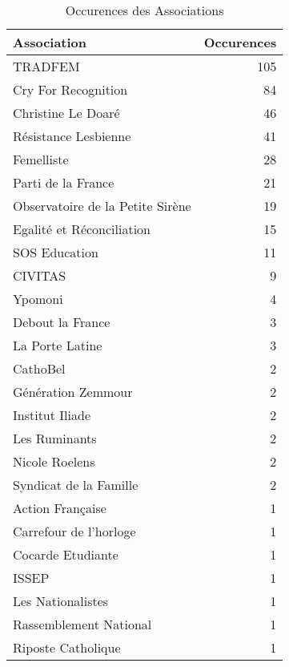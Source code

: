 \begin{table}

\caption{Occurences des Associations}
\centering
\begin{tabular}[t]{l|r}
\hline
Association & Occurences\\
\hline
TRADFEM & 105\\
\hline
Cry For Recognition & 84\\
\hline
Christine Le Doaré & 46\\
\hline
Résistance Lesbienne & 41\\
\hline
Femelliste & 28\\
\hline
Parti de la France & 21\\
\hline
Observatoire de la Petite Sirène & 19\\
\hline
Egalité et Réconciliation & 15\\
\hline
SOS Education & 11\\
\hline
CIVITAS & 9\\
\hline
Ypomoni & 4\\
\hline
Debout la France & 3\\
\hline
La Porte Latine & 3\\
\hline
CathoBel & 2\\
\hline
Génération Zemmour & 2\\
\hline
Institut Iliade & 2\\
\hline
Les Ruminants & 2\\
\hline
Nicole Roelens & 2\\
\hline
Syndicat de la Famille & 2\\
\hline
Action Française & 1\\
\hline
Carrefour de l'horloge & 1\\
\hline
Cocarde Etudiante & 1\\
\hline
ISSEP & 1\\
\hline
Les Nationalistes & 1\\
\hline
Rassemblement National & 1\\
\hline
Riposte Catholique & 1\\
\hline
\end{tabular}
\end{table}
